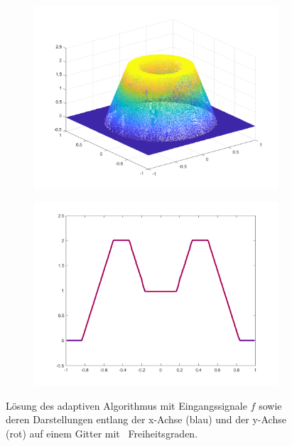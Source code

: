 \begin{figure}[p]
  \centering
  \begin{subfigure}[b]{.48\linewidth}
    \centering
    \includegraphics[trim = 40 30 30 30, clip, width=\linewidth]
      {pictures/chapExperiments/secExactSol/f01/adaptive/lvl14/solution.png}
    \label{fig:f01SolAdaptivePlot}
  \end{subfigure}
  \quad
  \begin{subfigure}[b]{.48\linewidth}
    \centering
    \includegraphics[trim = 50 30 50 20, clip, width=\linewidth]
      {pictures/chapExperiments/secExactSol/f01/adaptive/lvl14/solutionAxis.png}
    \label{fig:f01SolAdaptiveAxis}
  \end{subfigure}
  \caption{Lösung des adaptiven Algorithmus mit Eingangssignale $f$ sowie deren
  Darstellungen entlang der x-Achse (blau) und der y-Achse (rot) auf einem
  Gitter mit \nrDof\ Freiheitsgraden.}
  \label{fig:f01SolAdaptive}
\end{figure}

